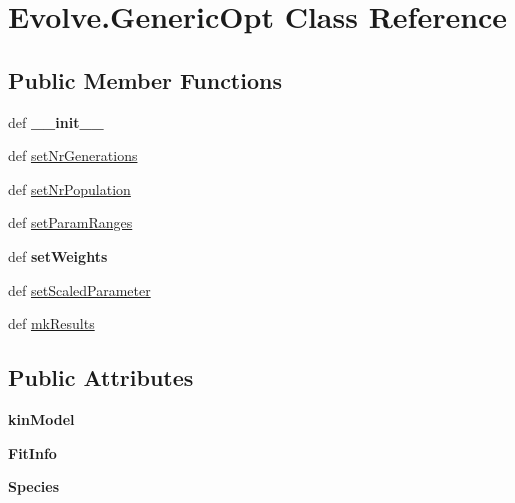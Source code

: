 \hypertarget{classEvolve_1_1GenericOpt}{\section{\-Evolve.\-Generic\-Opt \-Class \-Reference}
\label{classEvolve_1_1GenericOpt}
}
\subsection*{\-Public \-Member \-Functions}
\begin{DoxyCompactItemize}
\item 
\hypertarget{classEvolve_1_1GenericOpt_a24851e5445017586153f771b118cdba5}{def {\bfseries \-\_\-\-\_\-init\-\_\-\-\_\-}}\label{classEvolve_1_1GenericOpt_a24851e5445017586153f771b118cdba5}

\item 
def \hyperlink{classEvolve_1_1GenericOpt_a711c6865af0c7a618cc6aae7f073c965}{set\-Nr\-Generations}
\item 
def \hyperlink{classEvolve_1_1GenericOpt_a2c367c916fc10a33282d06403e7af618}{set\-Nr\-Population}
\item 
def \hyperlink{classEvolve_1_1GenericOpt_a21b20d6c52b28237bcaf290acd12ffa9}{set\-Param\-Ranges}
\item 
\hypertarget{classEvolve_1_1GenericOpt_af857e974e78ada2c40b2d2612fe9767b}{def {\bfseries set\-Weights}}\label{classEvolve_1_1GenericOpt_af857e974e78ada2c40b2d2612fe9767b}

\item 
def \hyperlink{classEvolve_1_1GenericOpt_a7d49a204c215dddd5b9213c1876e7270}{set\-Scaled\-Parameter}
\item 
def \hyperlink{classEvolve_1_1GenericOpt_a9bb83ef2e61f7043479f9bdf42008c35}{mk\-Results}
\end{DoxyCompactItemize}
\subsection*{\-Public \-Attributes}
\begin{DoxyCompactItemize}
\item 
\hypertarget{classEvolve_1_1GenericOpt_a76e8bb5810cfd078402d246680b8cd88}{{\bfseries kin\-Model}}\label{classEvolve_1_1GenericOpt_a76e8bb5810cfd078402d246680b8cd88}

\item 
\hypertarget{classEvolve_1_1GenericOpt_a470a25da1e20c87c433cf1edb585f7d4}{{\bfseries \-Fit\-Info}}\label{classEvolve_1_1GenericOpt_a470a25da1e20c87c433cf1edb585f7d4}

\item 
\hypertarget{classEvolve_1_1GenericOpt_afbef03fdbb671b658debd2464a8e1d50}{{\bfseries \-Species}}\label{classEvolve_1_1GenericOpt_afbef03fdbb671b658debd2464a8e1d50}

\end{DoxyCompactItemize}
